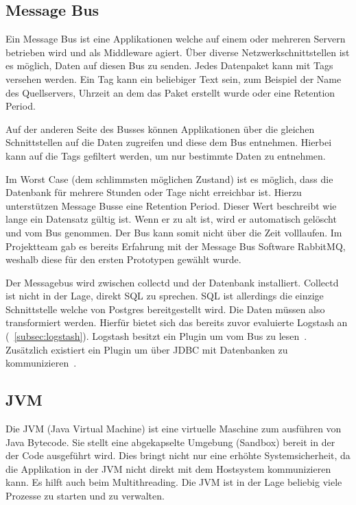 \subsection{Message Bus}
Ein Message Bus ist eine Applikationen welche auf einem oder mehreren Servern
betrieben wird und als \gls{Middleware} agiert. Über diverse
Netzwerkschnittstellen ist es möglich, Daten auf diesen Bus zu senden. Jedes
Datenpaket kann mit Tags versehen werden. Ein Tag kann ein beliebiger Text
sein, zum Beispiel der Name des Quellservers, Uhrzeit an dem das Paket erstellt
wurde oder eine Retention Period.

Auf der anderen Seite des Busses können Applikationen über die gleichen
Schnittstellen auf die Daten zugreifen und diese dem Bus entnehmen. Hierbei
kann auf die Tags gefiltert werden, um nur bestimmte Daten zu entnehmen.

Im Worst Case (dem schlimmsten möglichen Zustand) ist es möglich, dass die
Datenbank für mehrere Stunden oder Tage nicht erreichbar ist. Hierzu
unterstützen Message Busse eine Retention Period. Dieser Wert beschreibt wie
lange ein Datensatz gültig ist. Wenn er zu alt ist, wird er automatisch
gelöscht und vom Bus genommen. Der Bus kann somit nicht über die Zeit
volllaufen. Im Projektteam gab es bereits Erfahrung mit der Message Bus
Software RabbitMQ, weshalb diese für den ersten Prototypen gewählt wurde.

Der Messagebus wird zwischen collectd und der Datenbank installiert. Collectd
ist nicht in der Lage, direkt SQL zu sprechen. SQL ist allerdings die einzige
Schnittstelle welche von Postgres bereitgestellt wird. Die Daten müssen also
transformiert werden. Hierfür bietet sich das bereits zuvor evaluierte Logstash
an (~\ref{subsec:logstash}). Logstash besitzt ein Plugin um vom Bus zu
lesen~\cite{logstash-rabbitmq}. Zusätzlich existiert ein Plugin um über JDBC
mit Datenbanken zu kommunizieren~\cite{logstash-jdbc}.
\tm%

\subsection{JVM}
Die \gls{JVM} (Java Virtual Machine) ist eine virtuelle Maschine zum ausführen
von Java Bytecode. Sie stellt eine abgekapselte Umgebung (Sandbox) bereit in
der der Code ausgeführt wird. Dies bringt nicht nur eine erhöhte
Systemsicherheit, da die Applikation in der JVM nicht direkt mit dem Hostsystem
kommunizieren kann. Es hilft auch beim Multithreading. Die JVM ist in der Lage
beliebig viele Prozesse zu starten und zu verwalten.

